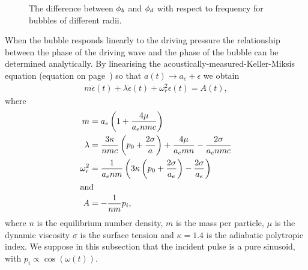 \begin{figure}
  \centering
  
  \caption{The difference between ${\phi_b}$ and ${\phi_d}$ with respect to frequency for bubbles of different radii.}
  \label{fig:DeltaPhi}
\end{figure}
When the bubble responds linearly to the driving pressure 
the relationship between the phase of the driving wave and the phase of the bubble can be determined analytically.
By linearising the acoustically-measured-Keller-Miksis equation (equation  on page~\pageref{eqn:RKM})
so that $a(t) \rightarrow a_e + \epsilon$
we obtain
\begin{align}
 m \ddot \epsilon(t) + \lambda \dot \epsilon(t) + \omega_r^2 \epsilon(t) = A(t), \label{eqn:SHO}
\end{align}
where 
\begin{align}
  m &= a_e\left( 1+ \frac{4\mu}{a_enmc} \right)\\
  \lambda &= \frac{3\kappa}{nmc}\left( p_0+\frac{2\sigma}{a} \right) + \frac{4\mu}{a_emn} - \frac{2\sigma}{a_e nmc}\\
  \omega_r^2 &= \frac{1}{a_enm}\left( 3\kappa \left( p_0 +\frac{2\sigma}{a_e} \right) - \frac{2\sigma}{a_e} \right)\label{eqn:omegar}\\
\intertext{and}
  A &=- \frac{1}{nm}{p_i},
\end{align}
where $n$ is the equilibrium number density, $m$ is the mass per particle, $\mu$ is the dynamic viscosity $\sigma$ is the surface tension and 
 $\kappa= 1.4$ is the adiabatic polytropic index.
We suppose in this subsection that the incident pulse is a pure sinusoid, with  $p_i \propto \cos(\omega(t))$.

